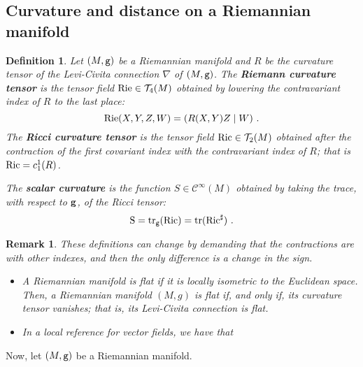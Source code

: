 \documentclass[12pt]{report}
\newtheorem{definition}[teor]{Definition}
\newtheorem{remark}[teor]{Remark}
\begin{document}
\subsection{Curvature and distance on a Riemannian manifold}


\begin{definition}
Let $(M,{\tt g})$ be a Riemannian manifold and $R$ be
the curvature tensor of the Levi-Civita connection $\nabla$ of $(M,{\tt g})$. 
The \textbf{Riemann curvature tensor} is the tensor field 
${\rm Rie}\in{\mathcal T}_4(M)$ obtained by lowering 
the contravariant index of $R$ to the last place:
$$
{\rm Rie}(X,Y,Z,W)=(R(X,Y)Z\mid W)\ .
$$
The \textbf{Ricci curvature tensor} is the tensor field 
${\rm Ric}\in{\mathcal T}_2(M)$ obtained after the contraction 
of the first covariant index with the contravariant index of $R$;
that is ${\rm Ric}=c_1^1(R)$.

\noindent The \textbf{scalar curvature} is the function 
$S\in{\mathcal C}^{\infty}(M)$ obtained by taking the trace, with respect to $\bf g$, of the Ricci tensor:
  $$
  {\rm S}={\rm tr}_{\tt g}({\rm Ric})={\rm tr}({\rm Ric}^\sharp)\ . 
  $$
\end{definition}

\begin{remark}{\rm  
These definitions can change by demanding that the contractions
are with other indexes, and then the only difference is a change in the sign.
  \begin{itemize}
  \item
A Riemannian manifold is {\sl flat} if it is locally isometric 
to the Euclidean space.
Then, a Riemannian manifold $(M,g)$ is flat if, and only if,
its curvature tensor vanishes; that is,
its Levi-Civita connection is flat.
  \item
In a local reference for vector fields, we have that
\end{itemize}
}\end{remark}

Now, let $(M,{\tt g})$ be a Riemannian manifold.
\end{document}
